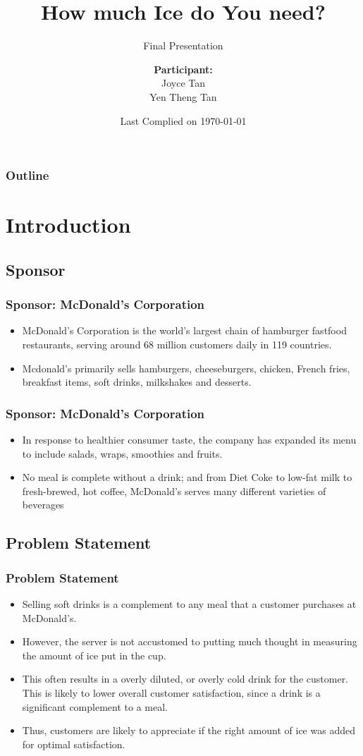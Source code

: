 \documentclass[compress,handout,10pt]{beamer}
\title{{\color{blue} \LARGE How much Ice do You need?\newline} }
\subtitle{{\color{red} \large Final Presentation} }
\author{ 
    {\bf{Participant:}} \\ 
Joyce Tan \\ 
Yen Theng Tan \\
    \vspace{5pt}
}
\institute{JHU AMS 2012 FALL}
\date{\mygreen Last Complied on \today}
\let\olditem\item
\renewcommand{\item}{\setlength{\itemsep}{0.5\baselineskip}\olditem}
\begin{document}
\begin{frame}[plain]
    \titlepage
\end{frame}


\begin{frame}
    \frametitle{Outline}
      \tableofcontents
\end{frame}

\section{Introduction}
\subsection{Sponsor}
\begin{frame}
    \frametitle{Sponsor: McDonald's Corporation}
    \begin{itemize}
     \item McDonald's Corporation is the world's largest chain of hamburger fastfood restaurants, serving around 68 million customers daily in 119 countries.
\item Mcdonald's primarily sells hamburgers, cheeseburgers, chicken, French fries, breakfast items, soft drinks, milkshakes and desserts. 
    \end{itemize}
\end{frame}

\begin{frame}
    \frametitle{Sponsor: McDonald's Corporation}
    \begin{itemize}
         	\item In response to healthier consumer taste, the company has expanded its menu to include salads, wraps, smoothies and fruits.
	 \item No meal is complete without a drink; and from Diet Coke to low-fat milk to fresh-brewed, hot coffee, McDonald's serves many different varieties of beverages
    \end{itemize}
\end{frame}

\subsection{Problem Statement}
\begin{frame}
    \frametitle{Problem Statement}
     \begin{itemize}
         \item Selling soft drinks is a complement to any meal that a customer purchases at McDonald's.
\item However, the server is not accustomed to putting much thought in measuring the amount of ice put in the cup.
\item This often results in a overly diluted, or overly cold drink for the customer. This is likely to lower overall customer satisfaction, since a drink is a significant complement to a meal. 
\item Thus, customers are likely to appreciate if the right amount of ice was added for optimal satisfaction.
     \end{itemize}
\end{frame}
\end{document}
